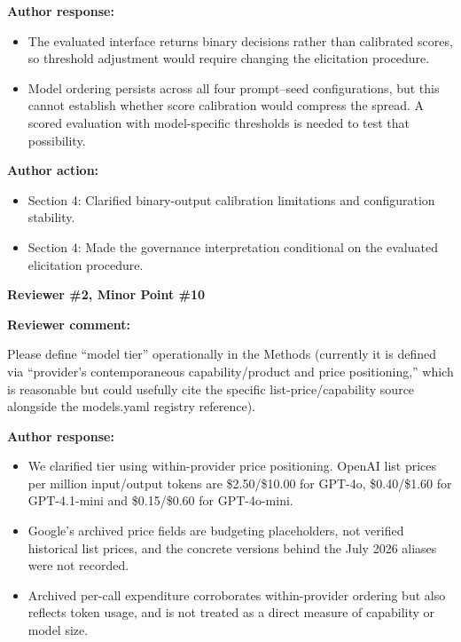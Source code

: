 \documentclass[11pt]{article}
\newcommand{\rvcomment}[1]{{\color{ReviewerGreen}#1}}
\newcommand{\concern}[1]{\textbf{\color{ReviewerGreen}#1}}
\begin{document}
\textbf{Author response:}

\begin{itemize}

\item The evaluated interface returns binary decisions rather than calibrated scores, so threshold adjustment would require changing the elicitation procedure.

\item Model ordering persists across all four prompt--seed configurations, but this cannot establish whether score calibration would compress the spread. A scored evaluation with model-specific thresholds is needed to test that possibility.

\end{itemize}

\textbf{Author action:}

\begin{itemize}

\item Section 4: Clarified binary-output calibration limitations and configuration stability.

\item Section 4: Made the governance interpretation conditional on the evaluated elicitation procedure.

\end{itemize}

\vspace{12pt}
\concern{Reviewer \#2, Minor Point \#10}

\concern{Reviewer comment:}

\rvcomment{Please define ``model tier'' operationally in the Methods (currently it is defined via ``provider's contemporaneous capability/product and price positioning,'' which is reasonable but could usefully cite the specific list-price/capability source alongside the models.yaml registry reference).}

\textbf{Author response:}

\begin{itemize}

\item We clarified tier using within-provider price positioning. OpenAI list prices per million input/output tokens are \$2.50/\$10.00 for GPT-4o, \$0.40/\$1.60 for GPT-4.1-mini and \$0.15/\$0.60 for GPT-4o-mini.

\item Google's archived price fields are budgeting placeholders, not verified historical list prices, and the concrete versions behind the July 2026 aliases were not recorded.

\item Archived per-call expenditure corroborates within-provider ordering but also reflects token usage, and is not treated as a direct measure of capability or model size.

\end{itemize}
\end{document}
